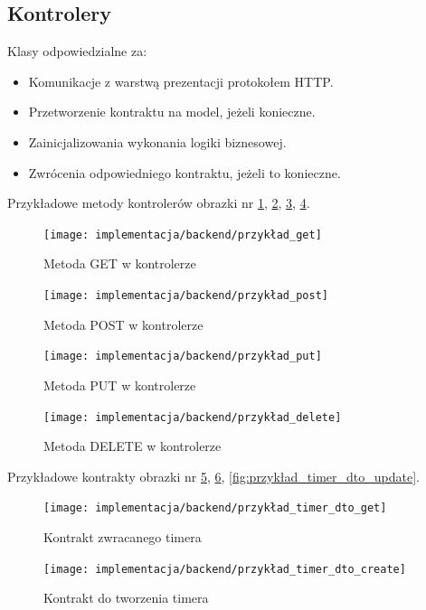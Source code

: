 \documentclass[a4paper,11pt]{report}
\begin{document}
\subsection{Kontrolery}
Klasy odpowiedzialne za:
\begin{itemize}
	\item Komunikacje z warstwą prezentacji protokołem HTTP.
	\item Przetworzenie kontraktu na model, jeżeli konieczne.
	\item Zainicjalizowania wykonania logiki biznesowej.
	\item Zwrócenia odpowiedniego kontraktu, jeżeli to konieczne.
\end{itemize}
Przykładowe metody kontrolerów obrazki nr
 \ref{fig:przykład_get}, \ref{fig:przykład_post}, \ref{fig:przykład_put}, \ref{fig:przykład_delete}.
\begin{figure}[H]
	\centering
	\texttt{[image: implementacja/backend/przykład\_get]}\\
	\caption{Metoda GET w kontrolerze}
	\label{fig:przykład_get}
\end{figure}
\begin{figure}[H]
	\centering
	\texttt{[image: implementacja/backend/przykład\_post]}\\
	\caption{Metoda POST w kontrolerze}
	\label{fig:przykład_post}
\end{figure}
\begin{figure}[H]
	\centering
	\texttt{[image: implementacja/backend/przykład\_put]}\\
	\caption{Metoda PUT w kontrolerze}
	\label{fig:przykład_put}
\end{figure}
\begin{figure}[H]
	\centering
	\texttt{[image: implementacja/backend/przykład\_delete]}\\
	\caption{Metoda DELETE w kontrolerze}
	\label{fig:przykład_delete}
\end{figure}
Przykładowe kontrakty obrazki nr
\ref{fig:przykład_timer_dto_get}, \ref{fig:przykład_timer_dto_create}, \ref{fig:przykład_timer_dto_update}.
\begin{figure}[H]
	\centering
	\texttt{[image: implementacja/backend/przykład\_timer\_dto\_get]}\\
	\caption{Kontrakt zwracanego timera}
	\label{fig:przykład_timer_dto_get}
\end{figure}
\begin{figure}[H]
	\centering
	\texttt{[image: implementacja/backend/przykład\_timer\_dto\_create]}\\
	\caption{Kontrakt do tworzenia timera}
	\label{fig:przykład_timer_dto_create}
\end{figure}
\end{document}
